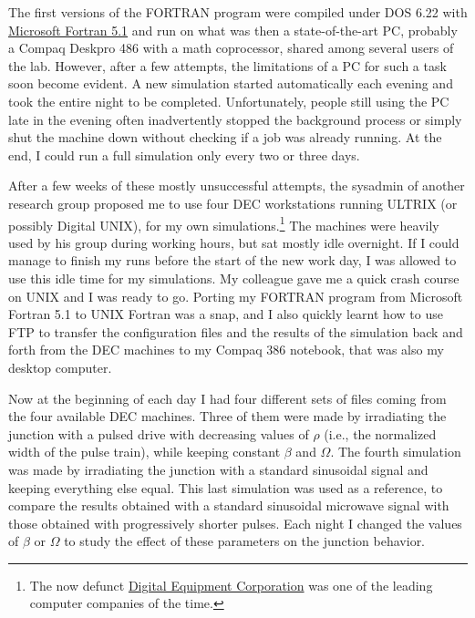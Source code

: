 The first versions of the FORTRAN program were compiled under DOS 6.22 with \href{https://winworldpc.com/product/microsoft-fortran/5x}{Microsoft Fortran 5.1} and run on what was then a state-of-the-art PC, probably a Compaq Deskpro 486 with a math coprocessor, shared among several users of the lab. 
However, after a few attempts, the limitations of a PC for such a task soon become evident.
A new simulation started automatically each evening and took the entire night to be completed. Unfortunately, people still using the PC late in the evening often inadvertently stopped the background process or simply shut the machine down without checking if a job was already running. 
At the end, I could run a full simulation only every two or three days.

After a few weeks of these mostly unsuccessful attempts, the sysadmin of another research group proposed me to use four DEC workstations running ULTRIX (or possibly Digital UNIX), for my own simulations.\footnote{The now defunct \href{https://en.wikipedia.org/wiki/Digital_Equipment_Corporation}{Digital Equipment Corporation} was one of the leading computer companies of the time.}
The machines were heavily used by his group during working hours, but sat mostly idle overnight. If I could manage to finish my runs before the start of the new work day, I was allowed to use this idle time for my simulations.
My colleague gave me a quick crash course on UNIX and I was ready to go.
Porting my FORTRAN program from Microsoft Fortran 5.1 to UNIX Fortran was a snap, and I also quickly learnt how to use FTP to transfer the configuration files and the results of the simulation back and forth from the DEC machines to my Compaq 386 notebook, that was also my desktop computer.

Now at the beginning of each day I had four different sets of files coming from the four available DEC machines. Three of them were made by irradiating the junction with a pulsed drive with decreasing values of $\rho$ (i.e., the normalized width of the pulse train), while keeping constant $\beta$ and $\Omega$.
The fourth simulation was made by irradiating the junction with a standard sinusoidal signal and keeping everything else equal. This last simulation was used as a reference, to compare the results obtained with a standard sinusoidal microwave signal with those obtained with progressively shorter pulses.
Each night I changed the values of $\beta$ or $\Omega$ to study the effect of these parameters on the junction behavior.


